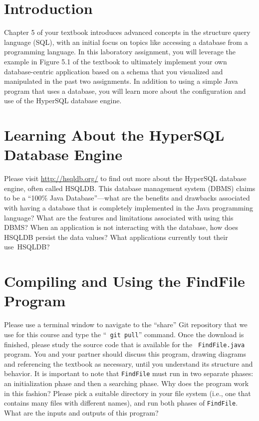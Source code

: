 


\usepackage[compact]{titlesec}



\section*{Introduction}

Chapter 5 of your textbook introduces advanced concepts in the structure query language (SQL), with an initial focus on
topics like accessing a database from a programming language. In this laboratory assignment, you will leverage the
example in Figure 5.1 of the textbook to ultimately implement your own database-centric application based on a schema
that you visualized and manipulated in the past two assignments. In addition to using a simple Java program that uses a
database, you will learn more about the configuration and use of the HyperSQL database engine.

\vspace*{-.05in}
\section*{Learning About the HyperSQL Database Engine}

Please visit \url{http://hsqldb.org/} to find out more about the HyperSQL database engine, often called HSQLDB. This
database management system (DBMS) claims to be a ``100\% Java Database''---what are the benefits and drawbacks
associated with having a database that is completely implemented in the Java programming language? What are the features
and limitations associated with using this DBMS? When an application is not interacting with the database, how does
HSQLDB persist the data values? What applications currently tout their \mbox{use HSQLDB}?

\vspace*{-.05in}
\section*{Compiling and Using the FindFile Program}

Please use a terminal window to navigate to the ``share'' Git repository that we use for this course and type the ``{\tt
  git pull}'' command. Once the download is finished, please study the source code that is available for the {\tt
  FindFile.java} program.  You and your partner should discuss this program, drawing diagrams and referencing the
textbook as necessary, until you understand its structure and behavior. It is important to note that {\tt FindFile} must
run in two separate phases: an initialization phase and then a searching phase. Why does the program work in this fashion?
Please pick a suitable directory in your file system (i.e., one that contains many files with different names), and run
both phases of {\tt FindFile}. What are the inputs and outputs of this program?

